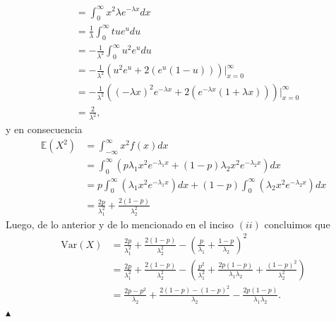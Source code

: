 \documentclass[12pt,a4paper]{article}
\theoremstyle{plain}
\theoremstyle{definition}
\theoremstyle{remark}
\newcommand{\E}{\mathbb{E}}
\begin{document}
\begin{enumerate}
\begin{align*}
            &= \int_{0}^{\infty}x^2\lambda e^{-\lambda x}dx \\
            &= \frac{1}{\lambda}\int_{0}^{\infty}tue^udu \\
            &= -\frac{1}{\lambda^2}\int_{0}^{\infty}u^2e^udu \\
            &= -\frac{1}{\lambda^2}\left(u^2e^u+2(e^u(1-u))\right)\Big|_{x=0}^\infty \\
            &= -\frac{1}{\lambda^2}\left((-\lambda x)^2e^{-\lambda x}+2(e^{-\lambda x}(1+\lambda x))\right)\Big|_{x=0}^\infty \\
            &= \frac{2}{\lambda^2},
        \end{align*}
        y en consecuencia
        \begin{align*}
            \E(X^2) &= \int_{-\infty}^{\infty}x^2f(x)dx \\
            &= \int_{0}^{\infty}\left(p\lambda_1x^2e^{-\lambda_1x} + (1 - p) \lambda_2x^2e^{-\lambda_2x}\right)dx \\
            &= p\int_{0}^{\infty}\left(\lambda_1x^2e^{-\lambda_1x}\right)dx + (1-p)\int_{0}^{\infty}\left(\lambda_2x^2e^{-\lambda_2x}\right)dx \\
            &= \frac{2p}{\lambda_1^2} + \frac{2(1-p)}{\lambda_2^2}
        \end{align*}
        Luego, de lo anterior y de lo mencionado en el inciso $(ii)$ concluimos que
        \begin{align*}
            \text{Var}(X) &= \frac{2p}{\lambda_1^2} + \frac{2(1-p)}{\lambda_2^2} - \left(\frac{p}{\lambda_1} + \frac{1-p}{\lambda_2}\right)^2 \\
            &= \frac{2p}{\lambda_1^2} + \frac{2(1-p)}{\lambda_2^2} - \left(\frac{p^2}{\lambda_1^2}+\frac{2p(1-p)}{\lambda_1\lambda_2}+\frac{(1-p)^2}{\lambda_2^2}\right) \\
            &= \frac{2p-p^2}{\lambda_2} + \frac{2(1-p)-(1-p)^2}{\lambda_2} - \frac{2p(1-p)}{\lambda_1\lambda_2}.
        \end{align*}
        \hfill $\blacktriangle$
\end{enumerate}
\end{document}
